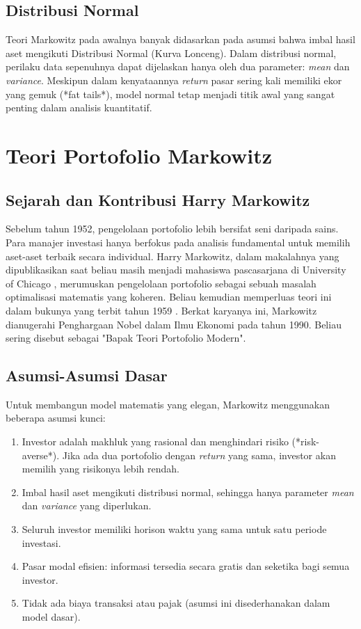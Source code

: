 \documentclass[12pt,a4paper]{book}
\begin{document}
\section{Distribusi Normal}
Teori Markowitz pada awalnya banyak didasarkan pada asumsi bahwa imbal hasil aset mengikuti Distribusi Normal (Kurva Lonceng). Dalam distribusi normal, perilaku data sepenuhnya dapat dijelaskan hanya oleh dua parameter: \textit{mean} dan \textit{variance}. Meskipun dalam kenyataannya \textit{return} pasar sering kali memiliki ekor yang gemuk (*fat tails*), model normal tetap menjadi titik awal yang sangat penting dalam analisis kuantitatif.

\chapter{Teori Portofolio Markowitz}

\section{Sejarah dan Kontribusi Harry Markowitz}
Sebelum tahun 1952, pengelolaan portofolio lebih bersifat seni daripada sains. Para manajer investasi hanya berfokus pada analisis fundamental untuk memilih aset-aset terbaik secara individual. Harry Markowitz, dalam makalahnya yang dipublikasikan saat beliau masih menjadi mahasiswa pascasarjana di University of Chicago \cite{markowitz1952portfolio}, merumuskan pengelolaan portofolio sebagai sebuah masalah optimalisasi matematis yang koheren. Beliau kemudian memperluas teori ini dalam bukunya yang terbit tahun 1959 \cite{markowitz1959portfolio}. Berkat karyanya ini, Markowitz dianugerahi Penghargaan Nobel dalam Ilmu Ekonomi pada tahun 1990. Beliau sering disebut sebagai "Bapak Teori Portofolio Modern".

\section{Asumsi-Asumsi Dasar}
Untuk membangun model matematis yang elegan, Markowitz menggunakan beberapa asumsi kunci:
\begin{enumerate}
    \item Investor adalah makhluk yang rasional dan menghindari risiko (*risk-averse*). Jika ada dua portofolio dengan \textit{return} yang sama, investor akan memilih yang risikonya lebih rendah.
    \item Imbal hasil aset mengikuti distribusi normal, sehingga hanya parameter \textit{mean} dan \textit{variance} yang diperlukan.
    \item Seluruh investor memiliki horison waktu yang sama untuk satu periode investasi.
    \item Pasar modal efisien: informasi tersedia secara gratis dan seketika bagi semua investor.
    \item Tidak ada biaya transaksi atau pajak (asumsi ini disederhanakan dalam model dasar).
\end{enumerate}
\end{document}
